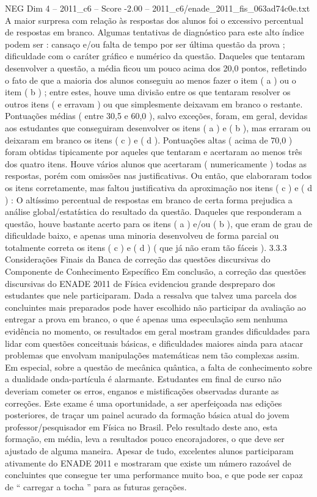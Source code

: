 \begin{textsample}{NEG Dim 4 – 2011\_c6 – Score -2.00 – 2011\_c6/enade\_2011\_fis\_063ad74c0e.txt}
A maior surpresa com relação às respostas dos alunos foi o excessivo percentual de respostas em branco.
Algumas tentativas de diagnóstico para este alto índice podem ser : cansaço e/ou falta de tempo por ser última questão da prova ; dificuldade com o caráter gráfico e numérico da questão.
Daqueles que tentaram desenvolver a questão, a média ficou um pouco acima dos 20,0 pontos, refletindo o fato de que a maioria dos alunos conseguiu ao menos fazer o item ( a ) ou o item ( b ) ; entre estes, houve uma divisão entre os que tentaram resolver os outros itens ( e erravam ) ou que simplesmente deixavam em branco o restante.
Pontuações médias ( entre 30,5 e 60,0 ), salvo exceções, foram, em geral, devidas aos estudantes que conseguiram desenvolver os itens ( a ) e ( b ), mas erraram ou deixaram em branco os itens ( c ) e ( d ).
Pontuações altas ( acima de 70,0 ) foram obtidas tipicamente por aqueles que tentaram e acertaram ao menos três dos quatro itens.
Houve vários alunos que acertaram ( numericamente ) todas as respostas, porém com omissões nas justificativas.
Ou então, que elaboraram todos os itens corretamente, mas faltou justificativa da aproximação nos itens ( c ) e ( d ) : O altíssimo percentual de respostas em branco de certa forma prejudica a análise global/estatística do resultado da questão.
Daqueles que responderam a questão, houve bastante acerto para os itens ( a ) e/ou ( b ), que eram de grau de dificuldade baixo, e apenas uma minoria desenvolveu de forma parcial ou totalmente correta os itens ( c ) e ( d ) ( que já não eram tão fáceis ). 3.3.3 Considerações Finais da Banca de correção das questões discursivas do Componente de Conhecimento Específico Em conclusão, a correção das questões discursivas do ENADE 2011 de Física evidenciou grande despreparo dos estudantes que nele participaram.
Dada a ressalva que talvez uma parcela dos concluintes mais preparados pode haver escolhido não participar da avaliação ao entregar a prova em branco, o que é apenas uma especulação sem nenhuma evidência no momento, os resultados em geral mostram grandes dificuldades para lidar com questões conceituais básicas, e dificuldades maiores ainda para atacar problemas que envolvam manipulações matemáticas nem tão complexas assim.
Em especial, sobre a questão de mecânica quântica, a falta de conhecimento sobre a dualidade onda-partícula é alarmante.
Estudantes em final de curso não deveriam cometer os erros, enganos e mistificações observadas durante as correções.
Este exame é uma oportunidade, a ser aperfeiçoada nas edições posteriores, de traçar um painel acurado da formação básica atual do jovem professor/pesquisador em Física no Brasil.
Pelo resultado deste ano, esta formação, em média, leva a resultados pouco encorajadores, o que deve ser ajustado de alguma maneira.
Apesar de tudo, excelentes alunos participaram ativamente do ENADE 2011 e mostraram que existe um número razoável de concluintes que consegue ter uma performance muito boa, e que pode ser capaz de “ carregar a tocha ” para as futuras gerações.

\end{textsample}
